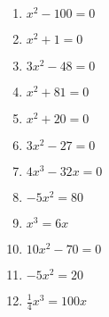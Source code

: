 \documentclass[12pt]{article}
\theoremstyle{definition}
\begin{document}
\begin{multicols}{4}
\begin{enumerate}
  \item $x^2-100=0$
	\item $x^2+1=0$
	\item $3x^2-48=0$
	\item $x^2+81=0$
	\item $x^2+20=0$
	\item $3x^2-27=0$
	\item $4x^3-32x=0$
	\item $-5x^2=80$
	\item $x^3=6x$
	\item $10x^2-70=0$
	\item $-5x^2=20$
	\item $\frac{1}{4}x^3=100x$
\end{enumerate}
\end{multicols}
\newpage
\end{document}
